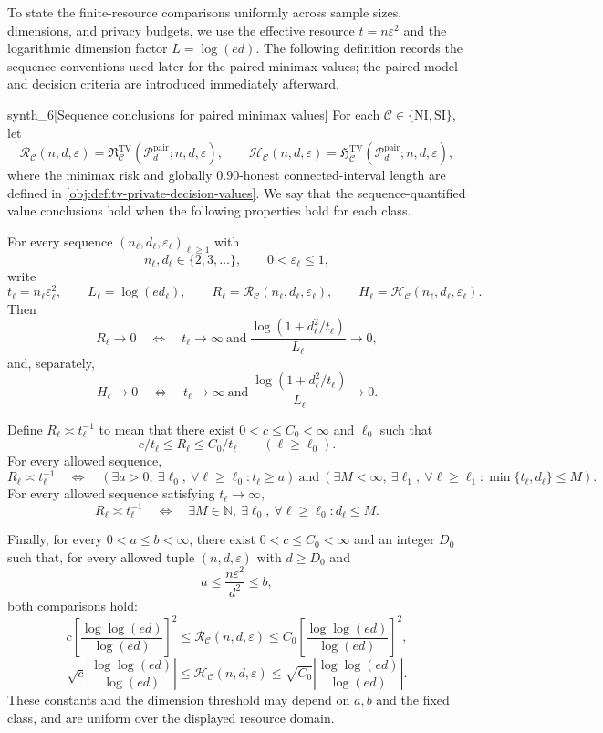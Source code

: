 \documentclass[11pt]{article}
\begin{document}
To state the finite-resource comparisons uniformly across sample sizes, dimensions, and privacy budgets, we use the effective resource \(t=n\varepsilon^2\) and the logarithmic dimension factor \(L=\log(ed)\). The following definition records the sequence conventions used later for the paired minimax values; the paired model and decision criteria are introduced immediately afterward.

\begin{definitionv}{synth_6}[Sequence conclusions for paired minimax values]
For each \(\mathcal C\in\{\mathrm{NI},\mathrm{SI}\}\), let
\[
\mathcal R_{\mathcal C}(n,d,\varepsilon)
=\mathfrak R^{\mathrm{TV}}_{\mathcal C}
(\mathcal P_d^{\mathrm{pair}};n,d,\varepsilon),
\qquad
\mathcal H_{\mathcal C}(n,d,\varepsilon)
=\mathfrak H^{\mathrm{TV}}_{\mathcal C}
(\mathcal P_d^{\mathrm{pair}};n,d,\varepsilon),
\]
where the minimax risk and globally \(0.90\)-honest connected-interval length are defined in \cref{obj:def:tv-private-decision-values}. We say that the sequence-quantified value conclusions hold when the following properties hold for each class.

For every sequence \((n_\ell,d_\ell,\varepsilon_\ell)_{\ell\ge1}\) with
\[
n_\ell,d_\ell\in\{2,3,\ldots\},
\qquad 0<\varepsilon_\ell\le1,
\]
write
\[
t_\ell=n_\ell\varepsilon_\ell^2,\qquad
L_\ell=\log(ed_\ell),\qquad
R_\ell=\mathcal R_{\mathcal C}(n_\ell,d_\ell,\varepsilon_\ell),
\qquad
H_\ell=\mathcal H_{\mathcal C}(n_\ell,d_\ell,\varepsilon_\ell).
\]
Then
\[
R_\ell\longrightarrow0
\quad\Longleftrightarrow\quad
t_\ell\longrightarrow\infty
\ \text{and}\
\frac{\log(1+d_\ell^2/t_\ell)}{L_\ell}\longrightarrow0,
\]
and, separately,
\[
H_\ell\longrightarrow0
\quad\Longleftrightarrow\quad
t_\ell\longrightarrow\infty
\ \text{and}\
\frac{\log(1+d_\ell^2/t_\ell)}{L_\ell}\longrightarrow0.
\]

Define \(R_\ell\asymp t_\ell^{-1}\) to mean that there exist \(0<c\le C_0<\infty\) and \(\ell_0\) such that
\[
c/t_\ell\le R_\ell\le C_0/t_\ell
\qquad(\ell\ge\ell_0).
\]
For every allowed sequence,
\[
R_\ell\asymp t_\ell^{-1}
\quad\Longleftrightarrow\quad
\left(\exists a>0,\ \exists\ell_0,\ \forall\ell\ge\ell_0:
t_\ell\ge a\right)
\ \text{and}\
\left(\exists M<\infty,\ \exists\ell_1,\ \forall\ell\ge\ell_1:
\min\{t_\ell,d_\ell\}\le M\right).
\]
For every allowed sequence satisfying \(t_\ell\to\infty\),
\[
R_\ell\asymp t_\ell^{-1}
\quad\Longleftrightarrow\quad
\exists M\in\mathbb N,\ \exists\ell_0,\ \forall\ell\ge\ell_0:
d_\ell\le M.
\]

Finally, for every \(0<a\le b<\infty\), there exist \(0<c\le C_0<\infty\) and an integer \(D_0\) such that, for every allowed tuple \((n,d,\varepsilon)\) with \(d\ge D_0\) and
\[
a\le\frac{n\varepsilon^2}{d^2}\le b,
\]
both comparisons hold:
\[
c\left[\frac{\log\log(ed)}{\log(ed)}\right]^2
\le\mathcal R_{\mathcal C}(n,d,\varepsilon)
\le C_0\left[\frac{\log\log(ed)}{\log(ed)}\right]^2,
\]
\[
\sqrt c\left|\frac{\log\log(ed)}{\log(ed)}\right|
\le\mathcal H_{\mathcal C}(n,d,\varepsilon)
\le\sqrt{C_0}\left|\frac{\log\log(ed)}{\log(ed)}\right|.
\]
These constants and the dimension threshold may depend on \(a,b\) and the fixed class, and are uniform over the displayed resource domain.
\end{definitionv}
\end{document}
